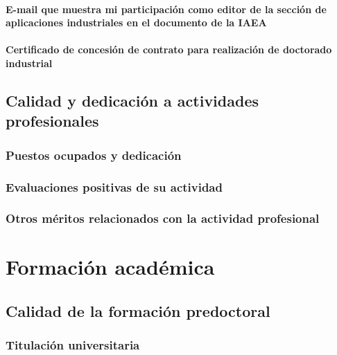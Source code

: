 \documentclass[a4paper, 11pt, twoside, openright]{report}
\begin{document}
\subsubsection{E-mail que muestra mi participación como editor de la sección de aplicaciones industriales en el documento de la IAEA}


\subsubsection{Certificado de concesión de contrato para realización de doctorado industrial}



\section{Calidad y dedicación a actividades profesionales}

\subsection{Puestos ocupados y dedicación}

\subsection{Evaluaciones positivas de su actividad}

\subsection{Otros méritos relacionados con la actividad profesional}

\chapter{Formación académica}



\section{Calidad de la formación predoctoral}

\subsection{Titulación universitaria}

\end{document}
